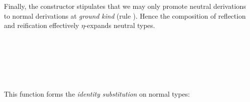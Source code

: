 \documentclass[sigplan,screen]{acmart}
\begin{document}
Finally, the  constructor  stipulates that we may only promote neutral derivations to normal derivations at \emph{ground kind} (rule ). Hence the composition of reflection and reification effectively $\eta$-expands neutral types.

\begin{AgdaAlign}
\begin{code}[hide]%
\>[0]\AgdaSpace{}%
\AgdaSpace{}%
\<%
\\
\>[0][@{}l@{\AgdaIndent{0}}]%
\>[2]\AgdaSpace{}%
\AgdaSpace{}%
\<%
\\
%
\>[2]\AgdaSpace{}%
\AgdaSpace{}%
\AgdaSpace{}%
\AgdaSymbol{;}\AgdaSpace{}%
\AgdaSpace{}%
\AgdaSpace{}%
\<%
\\
%
\>[2]\AgdaSpace{}%
\AgdaSpace{}%
\AgdaSpace{}%
\AgdaSpace{}%
\AgdaSymbol{(}\AgdaSymbol{)}\<%
\end{code}
\begin{code}%
%
\>[2]\AgdaSpace{}%
\AgdaSymbol{:}\AgdaSpace{}%
\AgdaSpace{}%
\AgdaSpace{}%
\AgdaSpace{}%
\AgdaSpace{}%
\AgdaSpace{}%
\AgdaSpace{}%
\<%
\\
%
\>[2]\AgdaSpace{}%
\AgdaSymbol{=}\AgdaSpace{}%
\AgdaSpace{}%
\AgdaSpace{}%
\<%
\end{code}
\end{AgdaAlign}

\Ni This function forms the \emph{identity substitution} on normal types:

\begin{AgdaAlign}
\begin{code}%
%
\>[2]\AgdaSpace{}%
\AgdaSymbol{:}\AgdaSpace{}%
\AgdaSymbol{(}\AgdaSpace{}%
\AgdaSymbol{:}\AgdaSpace{}%
\AgdaSpace{}%
\AgdaSpace{}%
\AgdaSymbol{)}\AgdaSpace{}%
\AgdaSpace{}%
\AgdaSpace{}%
\AgdaOperator{\AgdaField{[}}\AgdaSpace{}%
\AgdaSpace{}%
\AgdaSpace{}%
\AgdaSpace{}%
\AgdaOperator{\AgdaField{]ₛ}}\AgdaSpace{}%
\AgdaSpace{}%
\<%
\end{code}
\begin{code}[hide]%
%
\>[2]\AgdaSpace{}%
\AgdaSpace{}%
\AgdaSpace{}%
\<%
\\
%
\>[2]\AgdaSpace{}%
\AgdaSymbol{=}\AgdaSpace{}%
\<%
\end{code}
\end{AgdaAlign}
\fi
\end{document}
